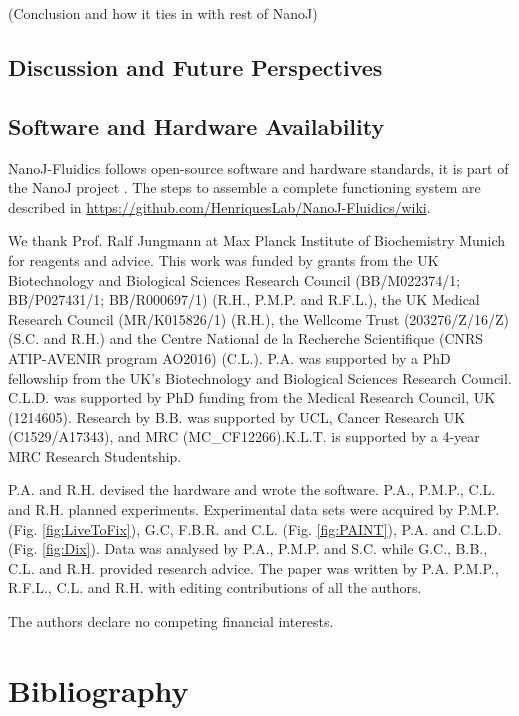 (Conclusion and how it ties in with rest of NanoJ)

\subsection*{Discussion and Future Perspectives}
\Blindtext

\subsection*{Software and Hardware Availability}
NanoJ-Fluidics follows open-source software and hardware standards, it is part of the NanoJ project \cite{gustafsson2016fast, culley2018quantitative,gray2016virusmapper}. The steps to assemble a complete functioning system are described in \href{https://github.com/HenriquesLab/NanoJ-Fluidics/wiki}{https://github.com/HenriquesLab/NanoJ-Fluidics/wiki}. 

\begin{acknowledgements}
    We thank Prof. Ralf Jungmann at Max Planck Institute of Biochemistry Munich for reagents and advice. This work was funded by grants from the UK Biotechnology and Biological Sciences Research Council (BB/M022374/1; BB/P027431/1; BB/R000697/1) (R.H., P.M.P. and R.F.L.), the UK Medical Research Council (MR/K015826/1) (R.H.), the Wellcome Trust (203276/Z/16/Z) (S.C. and R.H.) and the Centre National de la Recherche Scientifique (CNRS ATIP-AVENIR program AO2016) (C.L.). P.A. was supported by a PhD fellowship from the UK’s Biotechnology and Biological Sciences Research Council. C.L.D. was supported by PhD funding from the Medical Research Council, UK (1214605). Research by B.B. was supported by UCL, Cancer Research UK (C1529/A17343), and MRC (MC\_CF12266).K.L.T. is supported
    by a 4-year MRC Research Studentship.
\end{acknowledgements}


\begin{contributions}
    P.A. and R.H. devised the hardware and wrote the software. P.A., P.M.P., C.L. and R.H. planned experiments. Experimental data sets were acquired by P.M.P. (Fig. \ref{fig:LiveToFix}), G.C, F.B.R. and C.L. (Fig. \ref{fig:PAINT}), P.A. and C.L.D. (Fig. \ref{fig:Dix}). Data was analysed by P.A., P.M.P. and S.C. while G.C., B.B., C.L. and R.H. provided research advice. The paper was written by P.A. P.M.P., R.F.L., C.L. and R.H. with editing contributions of all the authors.
\end{contributions}

\begin{interests}
    The authors declare no competing financial interests.
\end{interests}

\section*{Bibliography}


